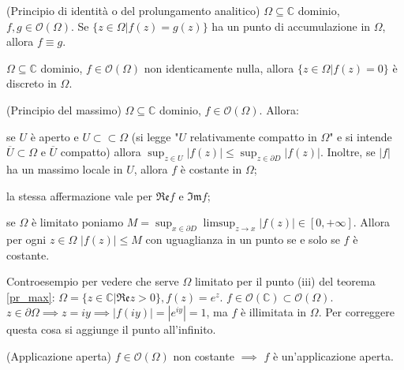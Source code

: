 \begin{thm}
  (Principio di identità o del prolungamento analitico) $\Omega \subseteq \mathbb{C}$ dominio, $f, g \in \mathcal{O}(\Omega)$. Se $\{z \in \Omega | f(z)=g(z)\}$ ha un punto di accumulazione in $\Omega$, allora $f \equiv g$.
\end{thm}

\begin{cor} \label{olo_discr}
  $\Omega \subseteq \mathbb{C}$ dominio, $f \in \mathcal{O}(\Omega)$ non identicamente nulla, allora $\{z \in \Omega | f(z)=0\}$ è discreto in $\Omega$.
\end{cor}

\begin{thm} \label{pr_max}
  (Principio del massimo) $\Omega \subseteq \mathbb{C}$ dominio, $f \in \mathcal{O}(\Omega)$. Allora:
  \begin{nlist}
    \item se $U$ è aperto e $U \subset \subset \Omega$ (si legge "$U$ relativamente compatto in $\Omega$" e si intende $\overline{U} \subset \Omega$ e $\overline{U}$ compatto) allora $\displaystyle \sup_{z \in U} |f(z)| \le \sup_{z \in \partial D} |f(z)|$. Inoltre, se $|f|$ ha un massimo locale in $U$, allora $f$ è costante in $\Omega$;
    \item la stessa affermazione vale per $\mathfrak{Re} f$ e $\mathfrak{Im} f$;
    \item se $\Omega$ è limitato poniamo $\displaystyle M=\sup_{x \in \partial D} \limsup_{z \rightarrow x} |f(z)| \in [0, +\infty]$. Allora per ogni $z \in \Omega$ $|f(z)| \le M$ con uguaglianza in un punto se e solo se $f$ è costante.
  \end{nlist}
\end{thm}

\begin{ex}
  Controesempio per vedere che serve $\Omega$ limitato per il punto (iii) del teorema \ref{pr_max}: $\Omega=\{z \in \mathbb{C} | \mathfrak{Re} z>0\}, f(z)=e^z$. $f \in \mathcal{O}(\mathbb{C}) \subset \mathcal{O}(\Omega)$.
  $z \in \partial\Omega \implies z=iy \implies |f(iy)|=|e^{iy}|=1$, ma $f$ è illimitata in $\Omega$. Per correggere questa cosa si aggiunge il punto all'infinito.
\end{ex}

\begin{thm}
  (Applicazione aperta) $f \in \mathcal{O}(\Omega)$ non costante $\implies$ $f$ è un'applicazione aperta.
\end{thm}

